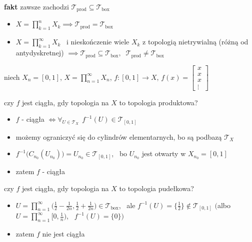 \documentclass[a4paper,12pt]{article}
\begin{document}
\bigskip
\textbf{fakt} \; zawsze zachodzi \(\mathcal{T}_{\text{prod}} \subseteq \mathcal{T}_{\text{box}}\)
\begin{itemize}
    \item \(X = \prod_{k=1}^{n} X_k \implies \mathcal{T}_{\text{prod}} = \mathcal{T}_{\text{box}}\)
    \item \(X = \prod_{k=1}^{\infty} X_k\) \, i nieskończenie wiele \(X_k\) z topologią nietrywialną (różną od antydyskretnej) \(\implies \mathcal{T}_{\text{prod}} \subseteq \mathcal{T}_{\text{box}}, \;\; \mathcal{T}_{\text{prod}} \neq \mathcal{T}_{\text{box}}\)
\end{itemize}

\bigskip
{} \; niech \(X_n = [0, 1]\), \; \(X = \prod_{n=1}^{\infty} X_n\), \; \(f: [0, 1] \to X\), \; \(f(x) = \begin{bmatrix} x \\ x \\ x \\ \vdots \end{bmatrix}\)
\begin{podpunkty}
    \item czy \(f\) jest ciągła, gdy topologia na \(X\) to topologia produktowa?
    \begin{itemize}
        \item \(f\) - ciągła \(\iff \forall_{U \in \mathcal{T}_X} \;\, f^{-1}(U) \in \mathcal{T}_{[0, 1]}\)
        \item możemy ograniczyć się do cylindrów elementarnych, bo są podbazą \(\mathcal{T}_X\)
        \item \(f^{-1}\big(C_{n_0}(U_{n_0})\big) = U_{n_0} \in \mathcal{T}_{[0, 1]}\), \, bo \(U_{n_0}\) jest otwarty w \(X_{n_0} = [0, 1]\)
        \item zatem \(f\) - ciągła
    \end{itemize}
    \item czy \(f\) jest ciągła, gdy topologia na \(X\) to topologia pudełkowa?
    \begin{itemize}
        \item \(U = \prod_{n=1}^{\infty} \big(\frac{1}{2} - \frac{1}{2n}, \frac{1}{2} + \frac{1}{2n}\big) \in \mathcal{T}_{\text{box}}\), \, ale \(f^{-1}(U) = \big\{\frac{1}{2}\big\} \notin \mathcal{T}_{[0, 1]}\) \quad \(\big(\)albo \(U = \prod_{n=1}^{\infty} \big[0, \frac{1}{n}\big)\), \, \(f^{-1}(U) = \{0\}\big)\)
        \item zatem \(f\) nie jest ciągła
    \end{itemize}
\end{podpunkty}
\end{document}
